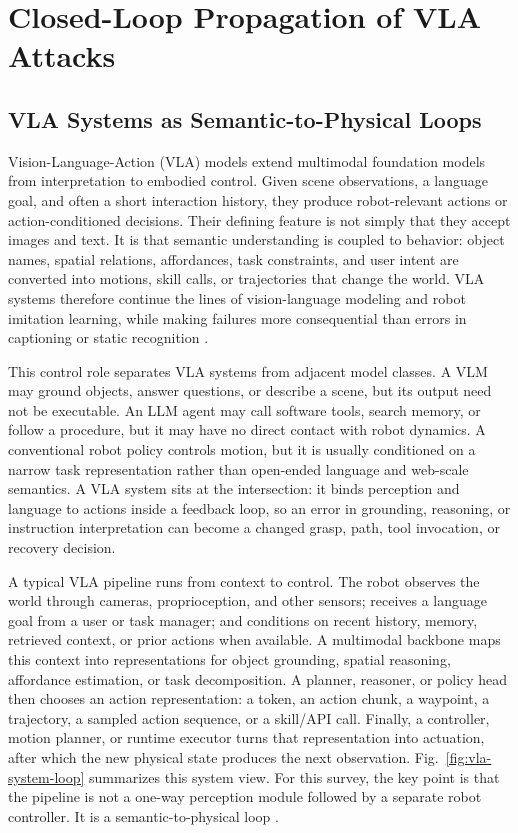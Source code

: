 \section{Closed-Loop Propagation of VLA Attacks}
\label{sec:taxonomy}

\subsection{VLA Systems as Semantic-to-Physical Loops}

Vision-Language-Action (VLA) models extend multimodal foundation models from interpretation to embodied control. Given scene observations, a language goal, and often a short interaction history, they produce robot-relevant actions or action-conditioned decisions. Their defining feature is not simply that they accept images and text. It is that semantic understanding is coupled to behavior: object names, spatial relations, affordances, task constraints, and user intent are converted into motions, skill calls, or trajectories that change the world. VLA systems therefore continue the lines of vision-language modeling and robot imitation learning, while making failures more consequential than errors in captioning or static recognition \cite{driess2023palme,brohan2023rt2,kim24openvla,ghosh2024octo,black2024pi0} \cite{sapkota2025vlasurvey,liu2025embodiedsurvey,xing2025robustsecure}.

This control role separates VLA systems from adjacent model classes. A VLM may ground objects, answer questions, or describe a scene, but its output need not be executable. An LLM agent may call software tools, search memory, or follow a procedure, but it may have no direct contact with robot dynamics. A conventional robot policy controls motion, but it is usually conditioned on a narrow task representation rather than open-ended language and web-scale semantics. A VLA system sits at the intersection: it binds perception and language to actions inside a feedback loop, so an error in grounding, reasoning, or instruction interpretation can become a changed grasp, path, tool invocation, or recovery decision.

A typical VLA pipeline runs from context to control. The robot observes the world through cameras, proprioception, and other sensors; receives a language goal from a user or task manager; and conditions on recent history, memory, retrieved context, or prior actions when available. A multimodal backbone maps this context into representations for object grounding, spatial reasoning, affordance estimation, or task decomposition. A planner, reasoner, or policy head then chooses an action representation: a token, an action chunk, a waypoint, a trajectory, a sampled action sequence, or a skill/API call. Finally, a controller, motion planner, or runtime executor turns that representation into actuation, after which the new physical state produces the next observation. Fig.~\ref{fig:vla-system-loop} summarizes this system view. For this survey, the key point is that the pipeline is not a one-way perception module followed by a separate robot controller. It is a semantic-to-physical loop \cite{lynch2022interactive,huang2022inner,belkhale2024rth,wu2023tidybot,saxena2014robobrain}.

